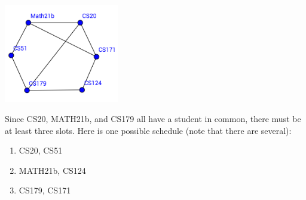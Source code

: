 \documentclass[solution, letterpaper]{cs20inclass}
\begin{document}
\begin{solution}
\includegraphics[width=5cm]{class21-2}

\noindent Since CS20, MATH21b, and CS179 all have a student in common, there must be at least three slots. Here is one possible schedule (note that there are several):

\begin{enumerate}
  \item CS20, CS51
  \item MATH21b, CS124
  \item CS179, CS171
\end{enumerate}
\end{solution}
\end{document}
